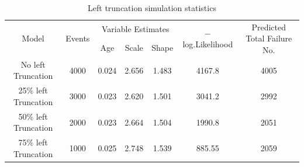\begin{table}[h!]
	\renewcommand{\arraystretch}{1.5}
	\small
	\centering
	\caption{Left truncation simulation statistics}
	\begin{tabular}{ccccccc}
		\hline
		\multirow{2}[4]{*}{Model} & \multirow{2}[4]{*}{Events} & \multicolumn{3}{c}{Variable Estimates} & \multirow{2}{3cm}{$-$ log.Likelihood} & \multirow{2}{3cm}{Predicted Total Failure No.}  \\
		\cline{3-5} %
				&       & Age   & Scale & Shape &  &\\				
		\hline
		No left Truncation & 4000  & 0.024 & 2.656 & 1.483 & 4167.8  &4005\\
		25\%  left Truncation & 3000  & 0.023 & 2.620  & 1.501 & 3041.2 & 2992\\
		50\%  left Truncation & 2000  & 0.023 & 2.664 & 1.504 & 1990.8 & 2051\\
		75\%  left Truncation & 1000  & 0.025 & 2.748 & 1.539 & 885.55 &2059\\
		\hline
		\end{tabular}%
	\label{tab:lefttruncation}%
\end{table}%

